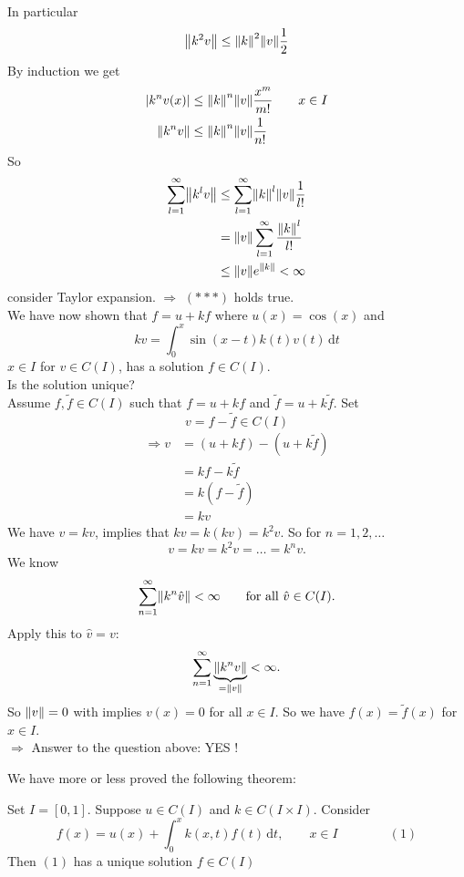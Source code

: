 \begin{enumerate}[1.]
	In particular
	\[
		\norm{k^2v} \leq \norm{k}^2 \norm{v} \frac{1}{2}
	\]
	By induction we get
	\begin{align*}
		\abs{k^n v(x)} &\leq \norm{k}^n \norm{v} \frac{x^m}{m!} \qquad x \in I \\
		\norm{k^n v} &\leq  \norm{k}^n \norm{v} \frac{1}{n!}
	\end{align*}
	So 
	\begin{align*}
		\sum_{l=1}^{\infty}\norm{k^lv} &\leq \sum_{l=1}^{\infty}\norm{k}^l \norm{v} \frac{1}{l!} \\
		&= \norm{v} \sum_{l=1}^{\infty} \frac{\norm{k}^l}{l!} \\
		&\leq \norm{v} e^{\norm{k}} < \infty
	\end{align*}
	consider Taylor expansion.
	$\Rightarrow $ $(***)$ holds true. \\
	We have now shown that $f = u+kf$ where $u(x) = \cos(x)$ and
	\[
		kv = \int_{0}^{x}\sin(x-t)k(t)v(t) \,\mathrm{d}t
	\]
	$x \in I$ for $v \in C(I)$, has a solution $f \in C(I)$. \\
	 Is the solution unique? \\
	Assume $f,\tilde f \in C(I)$ such that $f = u + k f$ and $\tilde f = u+ k \tilde f$. Set 
	\[
		v = f- \tilde f \in C(I)
	\]
	\begin{align*}
		\Rightarrow v &= (u+kf) - (u+ k \tilde f) \\ &= kf - k \tilde f \\ &= k(f- \tilde f) \\ &= kv
	\end{align*}
	We have $v = kv$, implies that $kv = k(kv) = k^2v$. So for $n=1,2,\dots$
	\[
		v = kv = k^2v = \dots = k^nv.
	\]
	We know 
	\[
		\sum_{n=1}^{\infty}\norm{k^n \hat{v}} < \infty \qquad \text{for all }\hat{v} \in C(I).
	\]
	Apply this to $\hat{v}=v$:
	\[
		\sum_{n=1}^{\infty}\underset{=\norm{v}}{\underbrace{\norm{k^nv}}} < \infty .
	\]
	So $\norm{v}=0$ with implies $v(x)=0$ for all $x \in I$.
	So we have $f(x)=\tilde f(x)$ for $x \in I$. \\
	$\Rightarrow $ Answer to the question above: YES ! 
\end{enumerate}
We have more or less proved the following theorem:
\begin{theorem}
	Set $I=[0,1]$. Suppose $u \in C(I)$ and $k \in C(I \times I)$. Consider 
	\[
		f(x) = u(x)+ \int_{0}^{x} k(x,t) f(t) \,\mathrm{d}t, \qquad x \in I \qquad \qquad (1)
	\]
	Then $(1)$ has a unique solution $f \in C(I)$
\end{theorem}
